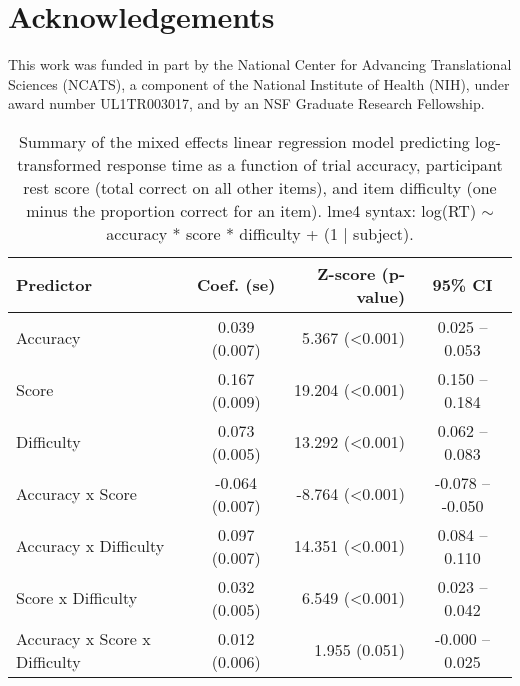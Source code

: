 \documentclass[a4paper,man,natbib,noextraspace]{apa6}
\begin{document}
\section{Acknowledgements}
\noindent This work was funded in part by the National Center for Advancing Translational Sciences (NCATS), a component of the National Institute of Health (NIH), under award number UL1TR003017, and by an NSF Graduate Research Fellowship.



\begin{table}[]
\centering
\begin{tabular*}{\textwidth}{lc@{\hskip 6mm}r@{\hskip 6mm}c}
\toprule
Predictor &  Coef. (se) & Z-score (p-value) & 95\% CI  \\
\midrule
Accuracy & 0.039 (0.007) &   5.367 (<0.001) &  0.025 -- 0.053  \\
Score &  0.167 (0.009) &  19.204 (<0.001) &  0.150 -- 0.184  \\
Difficulty & 0.073 (0.005) &  13.292 (<0.001) &  0.062 -- 0.083  \\
Accuracy x Score & -0.064 (0.007) &  -8.764 (<0.001) & -0.078 -- -0.050  \\
Accuracy x Difficulty & 0.097 (0.007) &  14.351 (<0.001) &  0.084 -- 0.110  \\
Score x Difficulty &  0.032 (0.005) &   6.549 (<0.001) &  0.023 -- 0.042  \\
Accuracy x Score x Difficulty &  0.012 (0.006) & 1.955 (0.051) & -0.000 -- 0.025  \\
\bottomrule
\end{tabular*}
\caption{\label{table:1}\normalfont Summary of the mixed effects linear regression model predicting log-transformed response time as a function of trial accuracy, participant rest score (total correct on all other items), and item difficulty (one minus the proportion correct for an item). \newline lme4 syntax: log(RT) $\sim$ accuracy * score * difficulty + (1 | subject).}
\end{table}
\end{document}
